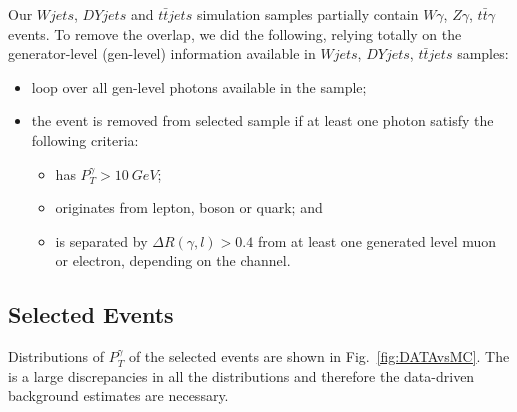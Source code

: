Our $Wjets$, $DYjets$ and $t\bar{t}jets$ simulation samples partially contain $W\gamma$, $Z\gamma$, $t\bar{t}\gamma$ events. To remove the overlap, we did the following, relying totally on the generator-level (gen-level) information available in $Wjets$, $DYjets$, $t\bar{t}jets$ samples:
\begin{itemize}
  \item loop over all gen-level photons available in the sample;
  \item the event is removed from selected sample if at least one photon satisfy the following criteria:
  \begin{itemize}
     \item has $P_T^{\gamma}>10~GeV$;
     \item originates from lepton, boson or quark; and
     \item is separated by $\Delta R(\gamma,l)>0.4$ from at least one generated level muon or electron, depending on the channel.
  \end{itemize}
\end{itemize}

\subsection{Selected Events}


Distributions of $P_T^{\gamma}$ of the selected events are shown in Fig.~\ref{fig:DATAvsMC}. The is a large discrepancies in all the distributions and therefore the data-driven background estimates are necessary.

